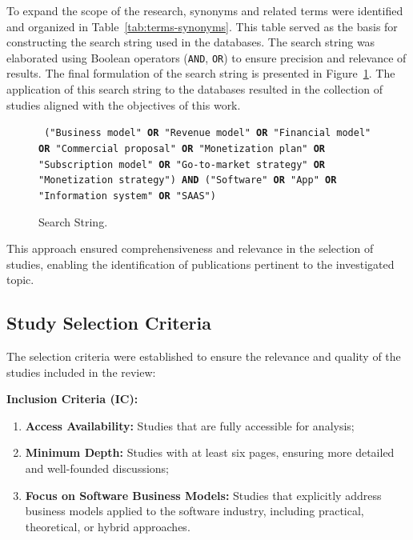 \documentclass[journal]{IEEEtran}
\begin{document}
To expand the scope of the research, synonyms and related terms were identified and organized in Table~\ref{tab:terms-synonyms}. This table served as the basis for constructing the search string used in the databases.
The search string was elaborated using Boolean operators (\texttt{AND}, \texttt{OR}) to ensure precision and relevance of results.
The final formulation of the search string is presented in Figure~\ref{fig:String}.
The application of this search string to the databases resulted in the collection of studies aligned with the objectives of this work.



\begin{figure}[!htb]
    \centering
    \begin{mdframed}[roundcorner=7pt,backgroundcolor=gray!25]
    \centering
    \small
    \texttt{
    ("Business model" \textbf{OR} "Revenue model" \textbf{OR} "Financial model" \textbf{OR} "Commercial proposal" \textbf{OR} "Monetization plan" \textbf{OR} "Subscription model" \textbf{OR} "Go-to-market strategy" \textbf{OR} "Monetization strategy")
    \textbf{AND} ("Software" \textbf{OR} "App" \textbf{OR} "Information system" \textbf{OR} "SAAS")
    }
    \end{mdframed}
    \caption{Search String.}
    \label{fig:String}
\end{figure}

This approach ensured comprehensiveness and relevance in the selection of studies, enabling the identification of publications pertinent to the investigated topic.

\subsection{Study Selection Criteria}\label{sec:study-selection-criteria}
The selection criteria were established to ensure the relevance and quality of the studies included in the review:

\textbf{Inclusion Criteria (IC):}
    \begin{enumerate}[label=\textbf{IC\arabic*.}]
        \item \textbf{Access Availability:} Studies that are fully accessible for analysis;

        \item \textbf{Minimum Depth:} Studies with at least six pages, ensuring more detailed and well-founded discussions;

        \item \textbf{Focus on Software Business Models:} Studies that explicitly address business models applied to the software industry, including practical, theoretical, or hybrid approaches.
    \end{enumerate}
\end{document}
